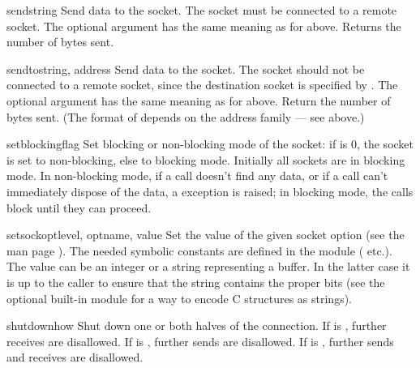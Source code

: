 \begin{methoddesc}[socket]{send}{string}
Send data to the socket.  The socket must be connected to a remote
socket.  The optional  argument has the same meaning as for
 above.  Returns the number of bytes sent.
\end{methoddesc}

\begin{methoddesc}[socket]{sendto}{string, address}
Send data to the socket.  The socket should not be connected to a
remote socket, since the destination socket is specified by
.  The optional  argument has the same
meaning as for  above.  Return the number of bytes sent.
(The format of  depends on the address family --- see above.)
\end{methoddesc}

\begin{methoddesc}[socket]{setblocking}{flag}
Set blocking or non-blocking mode of the socket: if  is 0,
the socket is set to non-blocking, else to blocking mode.  Initially
all sockets are in blocking mode.  In non-blocking mode, if a
 call doesn't find any data, or if a
 call can't immediately dispose of the data, a
 exception is raised; in blocking mode, the calls
block until they can proceed.
\end{methoddesc}

\begin{methoddesc}[socket]{setsockopt}{level, optname, value}
Set the value of the given socket option (see the \UNIX{} man page
).  The needed symbolic constants are defined in
the  module ( etc.).  The value can be an
integer or a string representing a buffer.  In the latter case it is
up to the caller to ensure that the string contains the proper bits
(see the optional built-in module
 for a way to encode C
structures as strings). 
\end{methoddesc}

\begin{methoddesc}[socket]{shutdown}{how}
Shut down one or both halves of the connection.  If  is
, further receives are disallowed.  If  is ,
further sends are disallowed.  If  is , further sends
and receives are disallowed.
\end{methoddesc}

